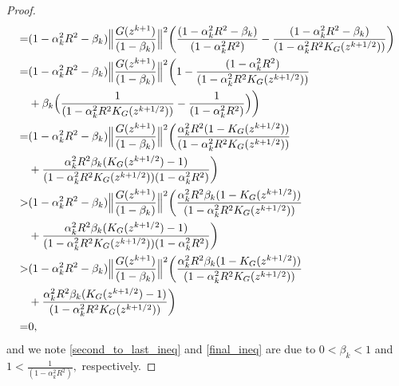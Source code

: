 \documentclass[11pt,reqno,oneside]{amsart}
\theoremstyle{definition}
\numberwithin{equation}{section}
\begin{document}
\begin{proof}
\begin{align}
        =& (1 - \alpha_{k}^{2}R^{2} - \beta_{k})\Big{\|} \frac{G(z^{k+1})}{(1 - \beta_{k})} \Big{\|}^{2}\bigg{(} \frac{(1 - \alpha_{k}^{2}R^{2} - \beta_{k})}{(1 - \alpha_{k}^{2}R^{2})} - \frac{(1 - \alpha_{k}^{2}R^{2} - \beta_{k})}{(1 - \alpha_{k}^{2}R^{2}K_{G}(z^{k+1/2}))} \bigg{)}\label{back_to_funny_alpha_lemma} \\
        =& (1 - \alpha_{k}^{2}R^{2} - \beta_{k})\Big{\|} \frac{G(z^{k+1})}{(1 - \beta_{k})} \Big{\|}^{2} \bigg{(} 1 - \frac{(1 - \alpha_{k}^{2}R^{2})}{(1 - \alpha_{k}^{2}R^{2}K_{G}(z^{k+1/2}))} \notag\\
        &+ \beta_{k} \Big{(}\frac{1}{(1 - \alpha_{k}^{2}R^{2}K_{G}(z^{k+1/2}))} - \frac{1}{(1 - \alpha_{k}^{2}R^{2})} \Big{)}\bigg{)} \notag \\
        =& (1 - \alpha_{k}^{2}R^{2} - \beta_{k})\Big{\|} \frac{G(z^{k+1})}{(1 - \beta_{k})} \Big{\|}^{2} \bigg{(} \frac{\alpha_{k}^{2}R^{2}(1 - K_{G}(z^{k+1/2}))}{(1 - \alpha_{k}^{2}R^{2}K_{G}(z^{k+1/2}))} \notag \\
        &+ \frac{\alpha_{k}^{2}R^{2}\beta_{k}(K_{G}(z^{k+1/2}) - 1)}{(1 - \alpha_{k}^{2}R^{2}K_{G}(z^{k+1/2}))(1 - \alpha_{k}^{2}R^{2})} \bigg{)} \notag \\
        >& (1 - \alpha_{k}^{2}R^{2} - \beta_{k})\Big{\|} \frac{G(z^{k+1})}{(1 - \beta_{k})} \Big{\|}^{2} \bigg{(} \frac{\alpha_{k}^{2}R^{2}\beta_{k}(1 - K_{G}(z^{k+1/2}))}{(1 - \alpha_{k}^{2}R^{2}K_{G}(z^{k+1/2}))} \notag \\
        &+ \frac{\alpha_{k}^{2}R^{2}\beta_{k}(K_{G}(z^{k+1/2}) - 1)}{(1 - \alpha_{k}^{2}R^{2}K_{G}(z^{k+1/2}))(1 - \alpha_{k}^{2}R^{2})} \bigg{)} \label{second_to_last_ineq} \\
        >& (1 - \alpha_{k}^{2}R^{2} - \beta_{k})\Big{\|} \frac{G(z^{k+1})}{(1 - \beta_{k})} \Big{\|}^{2} \bigg{(} \frac{\alpha_{k}^{2}R^{2}\beta_{k}(1 - K_{G}(z^{k+1/2}))}{(1 - \alpha_{k}^{2}R^{2}K_{G}(z^{k+1/2}))} \notag \\
        &+ \frac{\alpha_{k}^{2}R^{2}\beta_{k}(K_{G}(z^{k+1/2}) - 1)}{(1 - \alpha_{k}^{2}R^{2}K_{G}(z^{k+1/2}))} \bigg{)} \label{final_ineq} \\
        =& 0, \notag 
    \end{align}
   and we note \eqref{second_to_last_ineq} and \eqref{final_ineq} are due to $0 < \beta_{k} < 1$ and $\displaystyle 1 < \frac{1}{(1 - \alpha_{k}^{2}R^{2})},$ respectively.

\end{proof}
\end{document}
